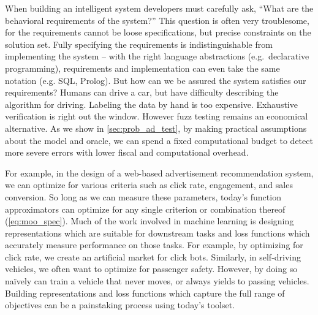When building an intelligent system developers must carefully ask, ``What are the behavioral requirements of the system?'' This question is often very troublesome, for the requirements cannot be loose specifications, but precise constraints on the solution set. Fully specifying the requirements is indistinguishable from implementing the system -- with the right language abstractions (e.g.\ declarative programming), requirements and implementation can even take the same notation (e.g. SQL, Prolog). But how can we be assured the system satisfies our requirements? Humans can drive a car, but have difficulty describing the algorithm for driving. Labeling the data by hand is too expensive. Exhaustive verification is right out the window. However fuzz testing remains an economical alternative. As we show in \autoref{sec:prob_ad_test}, by making practical assumptions about the model and oracle, we can spend a fixed computational budget to detect more severe errors with lower fiscal and computational overhead.

For example, in the design of a web-based advertisement recommendation system, we can optimize for various criteria such as click rate, engagement, and sales conversion. So long as we can measure these parameters, today's function approximators can optimize for any single criterion or combination thereof (\autoref{eq:moo_spec}). Much of the work involved in machine learning is designing representations which are suitable for downstream tasks and loss functions which accurately measure performance on those tasks. For example, by optimizing for click rate, we create an artificial market for click bots. Similarly, in self-driving vehicles, we often want to optimize for passenger safety. However, by doing so na\"ively can train a vehicle that never moves, or always yields to passing vehicles. Building representations and loss functions which capture the full range of objectives can be a painstaking process using today's toolset.